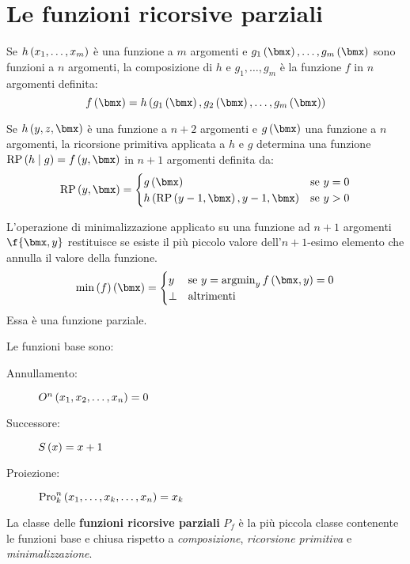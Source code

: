 \documentclass{lectures}
\begin{document}
\chapter{Le funzioni ricorsive parziali}
\begin{multicols}{2}
    \begin{definition}[Composizione]
        Se \(h\left(x_1, \ldots, x_m\right)\) è una funzione a \(m\) argomenti e \(g_1\rnd{\bmx}, \ldots, g_m\rnd{\bmx}\) sono funzioni a \(n\) argomenti, la composizione di \(h\) e \(g_1, \ldots, g_m\) è la funzione \(f\) in \(n\) argomenti definita:
        \[
            f\rnd{\bmx} = h\rnd{g_1\rnd{\bmx},g_2\rnd{\bmx}, \ldots, g_m\rnd{\bmx}}
        \]
    \end{definition}
    \begin{definition}
        Se \(h\rnd{y,z,\bmx}\) è una funzione a \(n+2\) argomenti e \(g\rnd{\bmx}\) una funzione a \(n\) argomenti, la ricorsione primitiva applicata a \(h\) e \(g\) determina una funzione \(\text{RP}\rnd{h\mid g} = f\rnd{y,\bmx}\) in \(n+1\) argomenti definita da:
        \[
            \text{RP}\rnd{y,\bmx} = \begin{cases}
                g\rnd{\bmx} & \text{se } y=0\\
                h\rnd{\text{RP}\rnd{y-1, \bmx}, y-1, \bmx} & \text{se }y>0
            \end{cases}
        \]
    \end{definition}
    \begin{definition}[Minimalizzazione]
        L'operazione di minimalizzazione applicato su una funzione ad \(n+1\) argomenti \(\f{\bmx, y}\) restituisce se esiste il più piccolo valore dell'\(n+1\)-esimo elemento che annulla il valore della funzione.
        \[
            \min\rnd{f}\rnd{\bmx} = \begin{cases}
                y & \text{se }y=\argmin_{y} f\rnd{\bmx, y} = 0\\
                \bot & \text{altrimenti}
            \end{cases}
        \]
        Essa è una funzione parziale.
    \end{definition}
    \begin{definition}
        Le funzioni base sono:
        \begin{description}
            \item[Annullamento:] \(O^n\left(x_1, x_2, \ldots, x_n\right)=0\) 
            \item[Successore:]\(S\left(x\right)=x+1\)
            \item[Proiezione:] \(\text{Pro}^n_k\left(x_1, \ldots, x_k, \ldots, x_n\right) = x_k\)
        \end{description}
    \end{definition}
    \begin{definition}
        La classe delle \textbf{funzioni ricorsive parziali} \(P_f\) è la più piccola classe contenente le funzioni base e chiusa rispetto a \textit{composizione}, \textit{ricorsione primitiva} e \textit{minimalizzazione}.
        

\end{definition}
\end{multicols}
\end{document}
